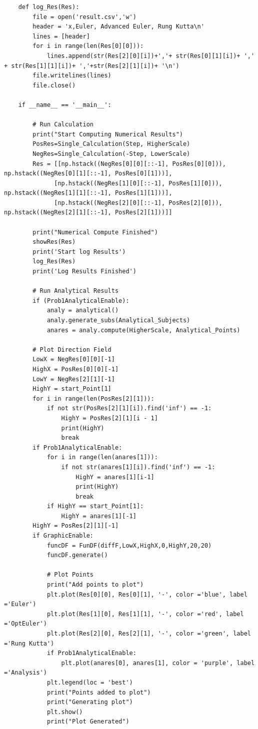 \documentclass[11pt,a4paper]{article}
\begin{document}
\begin{lstlisting}
	def log_Res(Res):
		file = open('result.csv','w')
		header = 'x,Euler, Advanced Euler, Rung Kutta\n'
		lines = [header]
		for i in range(len(Res[0][0])):
			lines.append(str(Res[2][0][i])+','+ str(Res[0][1][i])+ ',' + str(Res[1][1][i])+ ','+str(Res[2][1][i])+ '\n')
		file.writelines(lines)
		file.close()

	if __name__ == '__main__':

		# Run Calculation
		print("Start Computing Numerical Results")
		PosRes=Single_Calculation(Step, HigherScale)
		NegRes=Single_Calculation(-Step, LowerScale)
		Res = [[np.hstack((NegRes[0][0][::-1], PosRes[0][0])), np.hstack((NegRes[0][1][::-1], PosRes[0][1]))],
			  [np.hstack((NegRes[1][0][::-1], PosRes[1][0])), np.hstack((NegRes[1][1][::-1], PosRes[1][1]))],
			  [np.hstack((NegRes[2][0][::-1], PosRes[2][0])), np.hstack((NegRes[2][1][::-1], PosRes[2][1]))]]

		print("Numerical Compute Finished")
		showRes(Res)
		print('Start log Results')
		log_Res(Res)
		print('Log Results Finished')

		# Run Analytical Results
		if (Prob1AnalyticalEnable):
			analy = analytical()
			analy.generate_subs(Analytical_Subjects)
			anares = analy.compute(HigherScale, Analytical_Points)

		# Plot Direction Field
		LowX = NegRes[0][0][-1]
		HighX = PosRes[0][0][-1]
		LowY = NegRes[2][1][-1]
		HighY = start_Point[1]
		for i in range(len(PosRes[2][1])):
			if not str(PosRes[2][1][i]).find('inf') == -1:
				HighY = PosRes[2][1][i - 1]
				print(HighY)
				break
		if Prob1AnalyticalEnable:
			for i in range(len(anares[1])):
				if not str(anares[1][i]).find('inf') == -1:
					HighY = anares[1][i-1]
					print(HighY)
					break
			if HighY == start_Point[1]:
				HighY = anares[1][-1]
		HighY = PosRes[2][1][-1]
		if GraphicEnable:
			funcDF = FunDF(diffF,LowX,HighX,0,HighY,20,20)
			funcDF.generate()

			# Plot Points
			print("Add points to plot")
			plt.plot(Res[0][0], Res[0][1], '-', color ='blue', label ='Euler')
			plt.plot(Res[1][0], Res[1][1], '-', color ='red', label ='OptEuler')
			plt.plot(Res[2][0], Res[2][1], '-', color ='green', label ='Rung Kutta')
			if Prob1AnalyticalEnable:
				plt.plot(anares[0], anares[1], color = 'purple', label ='Analysis')
			plt.legend(loc = 'best')
			print("Points added to plot")
			print("Generating plot")
			plt.show()
			print("Plot Generated")
\end{lstlisting}
\end{document}
